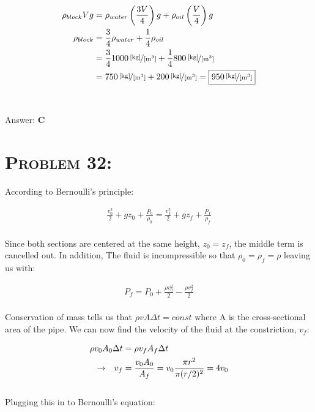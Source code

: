 \documentclass{article}
\begin{document}
\begin{align}
\rho_{block} V g &= \rho_{water} \left(\frac{3V}{4}\right) g + \rho_{oil} \left(\frac{V}{4}\right) g\nonumber\\
\rho_{block} &=  \frac{3}{4}\rho_{water} +\frac{1}{4}  \rho_{oil} \nonumber\\
&= \frac{3}{4} \unitfrac[1000]{[kg]}{[m^{3}]}+ \frac{1}{4}\unitfrac[800]{[kg]}{[m^{3}]}\nonumber\\
&= \unitfrac[750]{[kg]}{[m^{3}]}+\unitfrac[200]{[kg]}{[m^{3}]} = \boxed{\unitfrac[950]{[kg]}{[m^{3}]}}\nonumber
\end{align}
\\\\
Answer: \textbf{\textcolor{ProcessBlue}C}\\


\section{\textsc{Problem 32:}} According to Bernoulli's principle:

\begin{align}
\frac{v_{0}^{2}}{2} + g z_{0}+ \frac{P_{0}}{\rho_{0}} = \frac{v_{f}^{2}}{2} + g z_{f} + \frac{P_{f}}{\rho_{f}}
\end{align}
\\
Since both sections are centered at the same height, $z_{0} = z_{f}$, the middle term is cancelled out. In addition, The fluid is incompressible so that $\rho_{0} = \rho_{f} = \rho$ leaving us with:

\begin{align}
P_{f} = P_{0} + \frac{\rho v_{0}^{2}}{2}  - \frac{\rho v_{f}^{2}}{2}\nonumber
\end{align}
\\
Conservation of mass tells us that $\rho v A \Delta t = const$ where A is the cross-sectional area of the pipe. We can now find the velocity of the fluid at the constriction, $v_{f}$:

\begin{align}
\rho v_{0} A_{0} \Delta t &= \rho v_{f} A_{f} \Delta t \nonumber\\
\rightarrow \hspace{.1in} v_{f} &= \frac{v_{0}A_{0}}{A_{f}} = v_{0} \frac{\pi r^2}{\pi (r/2)^2}= 4v_{0}\nonumber
\end{align}
\\
Plugging this in to Bernoulli's equation:
\end{document}
